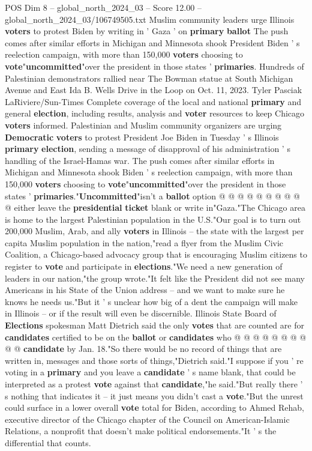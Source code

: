 \begin{textsample}{POS Dim 8 – global\_north\_2024\_03 – Score 12.00 – global\_north\_2024\_03/106749505.txt}  \label{ex:f8_pos_010}
Muslim community leaders urge Illinois \textbf{voters} to protest Biden by writing in ' Gaza ' on \textbf{primary} \textbf{ballot} The push comes after similar efforts in Michigan and Minnesota shook President Biden ' s reelection campaign, with more than 150,000 \textbf{voters} choosing to \textbf{vote}"\textbf{uncommitted}"over the president in those states ' \textbf{primaries}.
Hundreds of Palestinian demonstrators rallied near The Bowman statue at South Michigan Avenue and East Ida B.
Wells Drive in the Loop on Oct. 11, 2023.
Tyler Pasciak LaRiviere/Sun-Times Complete coverage of the local and national \textbf{primary} and general \textbf{election}, including results, analysis and \textbf{voter} resources to keep Chicago \textbf{voters} informed.
Palestinian and Muslim community organizers are urging \textbf{Democratic} \textbf{voters} to protest President Joe Biden in Tuesday ' s Illinois \textbf{primary} \textbf{election}, sending a message of disapproval of his administration ' s handling of the Israel-Hamas war.
The push comes after similar efforts in Michigan and Minnesota shook Biden ' s reelection campaign, with more than 150,000 \textbf{voters} choosing to \textbf{vote}"\textbf{uncommitted}"over the president in those states ' \textbf{primaries}."\textbf{Uncommitted}"isn't a \textbf{ballot} option @ @ @ @ @ @ @ @ @ @ either leave the \textbf{presidential} \textbf{ticket} blank or write in"Gaza."The Chicago area is home to the largest Palestinian population in the U.S."Our goal is to turn out 200,000 Muslim, Arab, and ally \textbf{voters} in Illinois -- the state with the largest per capita Muslim population in the nation,"read a flyer from the Muslim Civic Coalition, a Chicago-based advocacy group that is encouraging Muslim citizens to register to \textbf{vote} and participate in \textbf{elections}."We need a new generation of leaders in our nation,"the group wrote."It felt like the President did not see many Americans in his State of the Union address -- and we want to make sure he knows he needs us."But it ' s unclear how big of a dent the campaign will make in Illinois -- or if the result will even be discernible.
Illinois State Board of \textbf{Elections} spokesman Matt Dietrich said the only \textbf{votes} that are counted are for \textbf{candidates} certified to be on the \textbf{ballot} or \textbf{candidates} who @ @ @ @ @ @ @ @ @ @ \textbf{candidate} by Jan. 18."So there would be no record of things that are written in, messages and those sorts of things,"Dietrich said."I suppose if you ' re voting in a \textbf{primary} and you leave a \textbf{candidate} ' s name blank, that could be interpreted as a protest \textbf{vote} against that \textbf{candidate},"he said."But really there ' s nothing that indicates it -- it just means you didn't cast a \textbf{vote}."But the unrest could surface in a lower overall \textbf{vote} total for Biden, according to Ahmed Rehab, executive director of the Chicago chapter of the Council on American-Islamic Relations, a nonprofit that doesn't make political endorsements."It ' s the differential that counts.

\end{textsample}
